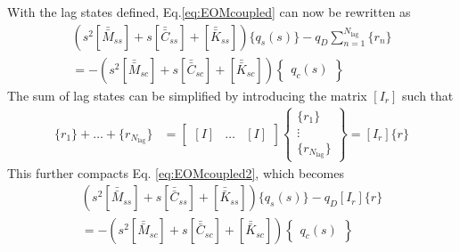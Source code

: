 With the lag states defined, Eq.\ref{eq:EOMcoupled} can now be rewritten as
\begin{multline}
	\label{eq:EOMcoupled2}
	\left( s^2 \left[\bar{\bar{M}}_{ss}\right] + s \left[\bar{\bar{C}}_{ss}\right] + \left[\bar{\bar{K}}_{ss}\right] \right) \{ q_s(s)\}
	- q_D \sum_{n=1}^{N_\text{lag}} \{r_n\}
	\\
	= - \left( s^2 \left[\bar{\bar{M}}_{sc}\right] + s \left[\bar{\bar{C}}_{sc}\right] + \left[\bar{\bar{K}}_{sc}\right] \right) \begin{Bmatrix} q_c(s) \end{Bmatrix}
\end{multline}
The sum of lag states can be simplified by introducing the matrix $[I_r]$ such that
\begin{align}
	\{r_1\} + \dots + \{r_{N_\text{lag}}\}
	&= \begin{bmatrix} [I] & \dots & [I] \end{bmatrix} \begin{Bmatrix} \{r_1\} \\ \vdots \\ \{r_{N_\text{lag}}\} \end{Bmatrix} = [I_r] \{r\}
\end{align}
This further compacts Eq. \ref{eq:EOMcoupled2}, which becomes
\begin{multline}
	\label{eq:EOMcoupled3}
	\left( s^2 \left[\bar{\bar{M}}_{ss}\right] + s \left[\bar{\bar{C}}_{ss}\right] + \left[\bar{\bar{K}}_{ss}\right] \right) \{ q_s(s)\}
	- q_D [I_r] \{r\}
	\\
	= - \left( s^2 \left[\bar{\bar{M}}_{sc}\right] + s \left[\bar{\bar{C}}_{sc}\right] + \left[\bar{\bar{K}}_{sc}\right] \right) \begin{Bmatrix} q_c(s) \end{Bmatrix}
\end{multline}

